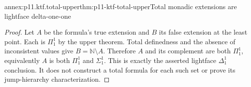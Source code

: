 \begin{annexitem}{annex:p11.ktf.total-upper}{thm:p11-ktf-total-upper}{Total monadic extensions are lightface delta-one-one}
\begin{proof}
Let \(A\) be the formula's true extension and \(B\) its false
extension at the least point. Each is \(\Pi^1_1\) by the upper
theorem. Total definedness and the absence of inconsistent values
give \(B=\mathbb N\setminus A\). Therefore \(A\) and its
complement are both \(\Pi^1_1\), equivalently \(A\) is both
\(\Pi^1_1\) and \(\Sigma^1_1\). This is exactly the asserted
lightface \(\Delta^1_1\) conclusion. It does not construct a
total formula for each such set or prove its jump-hierarchy
characterization.
\end{proof}
\end{annexitem}

